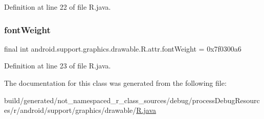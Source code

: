 Definition at line 22 of file R.\+java.

\mbox{\label{classandroid_1_1support_1_1graphics_1_1drawable_1_1_r_1_1attr_ae2c7f9b69aeb5af599fc6de1ba4fbf7c}} 
\subsubsection{\texorpdfstring{fontWeight}{fontWeight}}
{\footnotesize\ttfamily final int android.\+support.\+graphics.\+drawable.\+R.\+attr.\+font\+Weight = 0x7f0300a6\hspace{0.3cm}{\ttfamily [static]}}



Definition at line 23 of file R.\+java.



The documentation for this class was generated from the following file\+:\begin{DoxyCompactItemize}
\item 
build/generated/not\+\_\+namespaced\+\_\+r\+\_\+class\+\_\+sources/debug/process\+Debug\+Resources/r/android/support/graphics/drawable/\mbox{\hyperlink{android_2support_2graphics_2drawable_2_r_8java}{R.\+java}}\end{DoxyCompactItemize}
